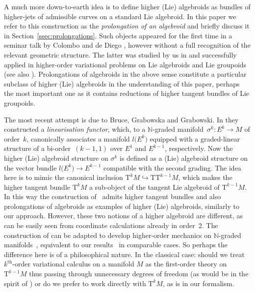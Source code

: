 \documentclass[pdftex]{sigma}
\newcommand{\grB}{{$\N$-graded manifold}}
\newcommand{\grBs}{{$\N$-graded manifolds}}
\newcommand{\degree}{{order}}
\newcommand{\thh}[1]{#1^{\mathrm{th}}} %
\newcommand{\N}{\mathbb{N}}
\newcommand{\ra}{\rightarrow}
\newcommand{\T}{\mathrm{T}} %
\newcommand{\TT}[1]{\mathrm{T}^{#1}} %
\numberwithin{equation}{section}
\theoremstyle{definition}
\begin{document}
A much more down-to-earth idea is to define higher (Lie) algebroids as bundles of higher-jets of admissible curves on a standard Lie algebroid. In this paper we refer to this construction as the \emph{prolongation of an algebroid} and briefly discuss it in Section~\ref{ssec:prolongations}. Such objects appeared for the first time in a seminar talk by Colombo and de Diego \cite{Col_deDiego_seminar_2011}, however without a full recognition of the relevant geometric structure. The latter was studied by us in \cite{MJ_MR_models_high_alg_2015} and successfully applied in higher-order variational problems on Lie algebroids and Lie groupoids \cite{MJ_MR_prototypes} (see also \cite{Martinez_2015}). Prolongations of algebroids in the above sense constitute a particular subclass of higher (Lie) algebroids in the understanding of this paper, perhaps the most important one as it contains reductions of higher tangent bundles of Lie groupoids.

The most recent attempt is due to Bruce, Grabowska and Grabowski. In \cite{Bruce_Grabowska_Grabowski_2016} they constructed a \emph{linearisation functor}, which, to a \grB\ $\sigma^k\colon E^k\ra M$ of \degree\ $k$, canonically associates a manifold $l\big(E^k\big)$ equipped with a graded-linear structure of a bi-\degree\ $(k-1,1)$ over $E^1$ and $E^{k-1}$, respectively. Now the higher (Lie) algebroid structure on $\sigma^k$ is defined as a (Lie) algebroid structure on the vector bundle $l\big(E^k\big)\ra E^{k-1}$ compatible with the second grading. The idea here is to mimic the canonical inclusion $\TT{k} M\hookrightarrow \T \TT{k-1} M$, which makes the higher tangent bundle $\TT{k}M$ a sub-object of the tangent Lie algebroid of $\TT{k-1}M$. In this way the construction of~\cite{Bruce_Grabowska_Grabowski_2016} admits higher tangent bundles and also prolongations of algebroids as examples of higher (Lie) algebroids, similarly to our approach. However, these two notions of a higher algebroid are different, as can be easily seen from coordinate calculations already in \degree\ 2. The construction of \cite{Bruce_Grabowska_Grabowski_2016} can be adapted to develop higher-order mechanics on \grBs\ \cite{BGG_2015}, equivalent to our results~\cite{MJ_MR_prototypes} in comparable cases. So perhaps the difference here is of a philosophical nature. In the classical case: should we treat $\thh{k}$-order variational calculus on a manifold $M$ as the first-order theory on~$\TT{k-1}M$ thus passing through unnecessary degrees of freedom (as would be in the spirit of \cite{Bruce_Grabowska_Grabowski_2016}) or do we prefer to work directly with $\TT{k} M$, as is in our formalism.
\end{document}
